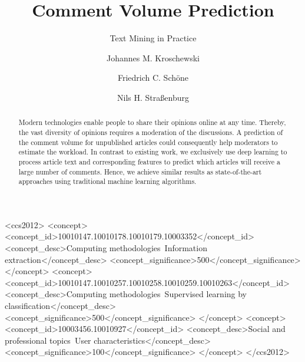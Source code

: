 \documentclass[10pt,sigconf]{acmart}
\begin{document}
\title{Comment Volume Prediction}
\subtitle{Text Mining in Practice} 

\author{Johannes M. Kroschewski}

\author{Friedrich C. Schöne}

\author{Nils H. Straßenburg}

\begin{abstract}
Modern technologies enable people to share their opinions online at any time.
Thereby, the vast diversity of opinions requires a moderation of the discussions.
A prediction of the comment volume for unpublished articles could consequently help moderators to estimate the workload.
In contrast to existing work, we exclusively use deep learning to process article text and corresponding features to predict which articles will receive a large number of comments.
Hence, we achieve similar results as state-of-the-art approaches using traditional machine learning algorithms.
\end{abstract}

\begin{CCSXML}
	<ccs2012>
	<concept>
	<concept_id>10010147.10010178.10010179.10003352</concept_id>
	<concept_desc>Computing methodologies~Information extraction</concept_desc>
	<concept_significance>500</concept_significance>
	</concept>
	<concept>
	<concept_id>10010147.10010257.10010258.10010259.10010263</concept_id>
	<concept_desc>Computing methodologies~Supervised learning by classification</concept_desc>
	<concept_significance>500</concept_significance>
	</concept>
	<concept>
	<concept_id>10003456.10010927</concept_id>
	<concept_desc>Social and professional topics~User characteristics</concept_desc>
	<concept_significance>100</concept_significance>
	</concept>
	</ccs2012>
\end{CCSXML}
\end{document}
